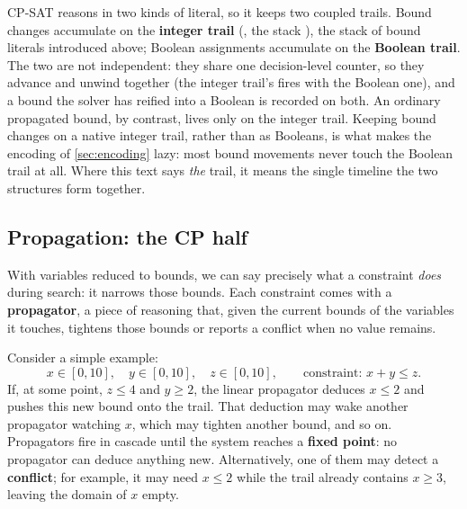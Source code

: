 CP-SAT reasons in two kinds of literal, so it keeps two coupled trails. Bound
changes accumulate on the \textbf{integer trail}
(, the stack ), the stack of bound literals introduced above; Boolean
assignments accumulate on the \textbf{Boolean trail}. The two are not
independent: they share one decision-level counter, so they advance and unwind
together (the integer trail's  fires with
the Boolean one), and a bound the solver has reified into a Boolean is recorded
on both. An ordinary propagated bound, by contrast, lives only on the integer
trail. Keeping bound changes on a native integer trail, rather than as Booleans,
is what makes the encoding of \cref{sec:encoding} lazy: most bound movements
never touch the Boolean trail at all. Where this text says \emph{the} trail, it
means the single timeline the two structures form together.

\subsection{Propagation: the CP half}

With variables reduced to bounds, we can say precisely what a constraint
\emph{does} during search: it narrows those bounds. Each constraint comes with a
\textbf{propagator}, a piece of reasoning that, given the current bounds of the
variables it touches, tightens those bounds or reports a conflict when no value
remains.

Consider a simple example:
\[
  x \in [0, 10],\quad y \in [0, 10],\quad z \in [0, 10],
  \qquad \text{constraint: } x + y \le z .
\]
If, at some point, $z \le 4$ and $y \ge 2$, the linear propagator deduces
$x \le 2$ and pushes this new bound onto the trail. That deduction may wake
another propagator watching $x$, which may tighten another bound, and so on.
Propagators fire in cascade until the system reaches a \textbf{fixed point}: no
propagator can deduce anything new. Alternatively, one of them may detect a
\textbf{conflict}; for example, it may need $x \le 2$ while the trail already
contains $x \ge 3$, leaving the domain of $x$ empty.

